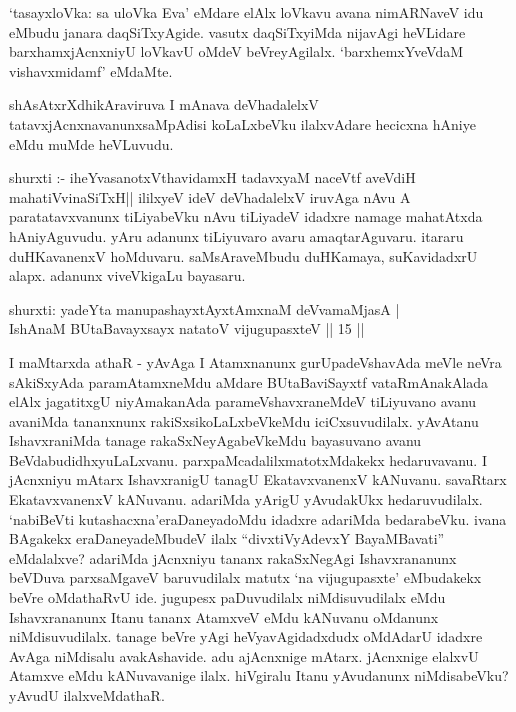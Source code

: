 \begin{artha}
`tasayxloVka: sa uloVka Eva' eMdare elAlx loVkavu avana nimARNaveV idu eMbudu janara daqSiTxyAgide. vasutx daqSiTxyiMda nijavAgi heVLidare barxhamxjAcnxniyU loVkavU oMdeV beVreyAgilalx. `barxhemxYveVdaM vishavxmidamf' eMdaMte.
\end{artha}

\begin{artha}
shAsAtxrXdhikAraviruva I mAnava deVhadalelxV tatavxjAcnxnavanunx\break saMpAdisi koLaLxbeVku ilalxvAdare hecicxna hAniye eMdu muMde heVLuvudu.
\end{artha}

\begin{artha}
shurxti :- iheYvasanotxV\s thavidamxH tadavxyaM naceVtf aveVdiH mahatiVvinaSiTxH|| ililxyeV ideV deVhadalelxV iruvAga nAvu A paratatavxvanunx tiLiyabeVku nAvu tiLiyadeV idadxre namage mahatAtxda hAniyAguvudu. yAru adanunx tiLiyuvaro avaru amaqtarAguvaru. itararu duHKavanenxV hoMduvaru. saMsAraveMbudu duHKamaya, suKavidadxrU alapx. adanunx viveVkigaLu bayasaru.
\end{artha}


\begin{shl}
shurxti: yadeYta manupashayxtAyxtAmxnaM deVvamaMjasA |\\
IshAnaM BUtaBavayxsayx natatoV vijugupasxteV || 15 ||
\end{shl}

\begin{artha}
I maMtarxda athaR - yAvAga I Atamxnanunx gurUpadeVshavAda meVle neVra sAkiSxyAda paramAtamxneMdu aMdare BUtaBaviSayxtf vataRmAnakAlada elAlx jagatitxgU niyAmakanAda parameVshavxraneMdeV tiLiyuvano avanu avaniMda tananxnunx rakiSxsikoLaLxbeVkeMdu iciCxsuvudilalx. yAvAtanu IshavxraniMda tanage rakaSxNeyAgabeVkeMdu bayasuvano avanu BeVdabudidhxyuLaLxvanu. parxpaMcadalilx\break matotxMdakekx hedaruvavanu. I jAcnxniyu mAtarx IshavxranigU tanagU EkatavxvanenxV kANuvanu. savaRtarx EkatavxvanenxV kANuvanu. adariMda yArigU yAvudakUkx hedaruvudilalx. `nabiBeVti kutashacxna'\break eraDaneyadoMdu idadxre adariMda bedarabeVku. ivana BAgakekx eraDaneyadeMbudeV ilalx ``divxtiVyAdevxY BayaMBavati'' eMdalalxve? adariMda jAcnxniyu tananx rakaSxNegAgi Ishavxrananunx beVDuva parxsaMgaveV baruvudilalx matutx `na vijugupasxte' eMbudakekx beVre oMdathaRvU ide. jugupesx paDuvudilalx niMdisuvudilalx eMdu Ishavxrananunx Itanu tananx AtamxveV eMdu kANuvanu oMdanunx niMdisuvudilalx. tanage beVre yAgi heVyavAgidadxdudx oMdAdarU idadxre AvAga niMdisalu avakAshavide. adu ajAcnxnige mAtarx. jAcnxnige elalxvU Atamxve eMdu kANuvavanige ilalx. hiVgiralu Itanu yAvudanunx niMdisabeVku? yAvudU ilalxveMdathaR.
\end{artha}


